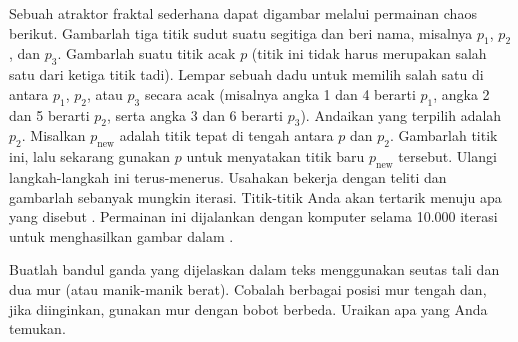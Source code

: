 \begin{samepage}
\begin{exercise}[proyek]
Sebuah atraktor fraktal sederhana dapat digambar melalui permainan chaos
berikut.  Gambarlah tiga titik sudut suatu segitiga dan beri nama, misalnya
$p_1$, $p_2$, dan $p_3$.  Gambarlah suatu titik acak $p$ (titik ini tidak harus
merupakan salah satu dari ketiga titik tadi).  Lempar sebuah dadu untuk memilih
salah satu di antara $p_1$, $p_2$, atau $p_3$ secara acak (misalnya angka 1 dan
4 berarti $p_1$, angka 2 dan 5 berarti $p_2$, serta angka 3 dan 6 berarti
$p_3$).  Andaikan yang terpilih adalah $p_2$.  Misalkan $p_{\text{new}}$ adalah
titik tepat di tengah antara $p$ dan $p_2$.  Gambarlah titik ini, lalu sekarang
gunakan $p$ untuk menyatakan titik baru $p_{\text{new}}$ tersebut.  Ulangi
langkah-langkah ini terus-menerus.  Usahakan bekerja dengan teliti dan gambarlah
sebanyak mungkin iterasi.  Titik-titik Anda akan tertarik menuju apa yang
disebut \emph{}.  Permainan ini dijalankan dengan
komputer selama 10.000 iterasi untuk menghasilkan gambar dalam
.
\end{exercise}
\end{samepage}

\begin{myfig}
\capstart
{}
\caption{10.000 iterasi permainan chaos yang menghasilkan
segitiga Sierpinski. \label{nlin:sierpinski}}
\end{myfig}

\begin{exercise}[proyek]
Buatlah bandul ganda yang dijelaskan dalam teks menggunakan seutas tali dan
dua mur (atau manik-manik berat).  Cobalah berbagai posisi mur tengah dan,
jika diinginkan, gunakan mur dengan bobot berbeda.  Uraikan apa yang Anda
temukan.
\end{exercise}

